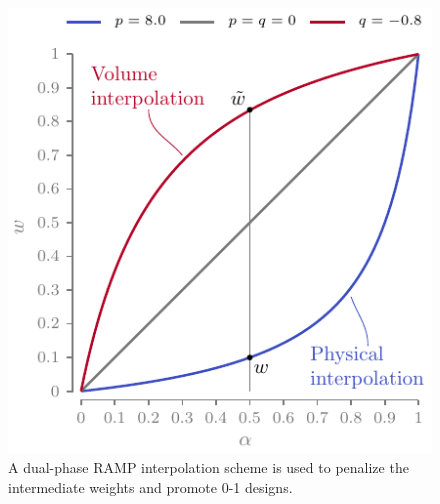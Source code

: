\begin{figure}
    \centering
    \includegraphics{figures/06_DMO/00_ramp/ramp.pdf}
    \caption{A dual-phase RAMP interpolation scheme is used to penalize the intermediate weights and promote 0-1 designs.}
    \label{fig:06_ramp}
\end{figure}

